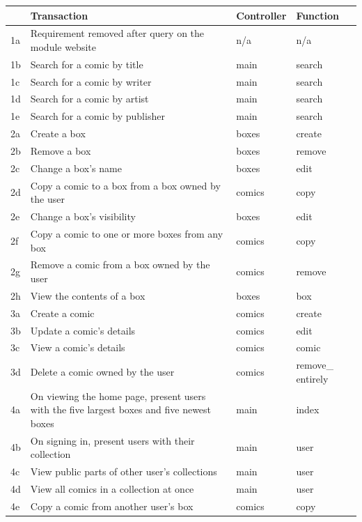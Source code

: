 \documentclass{scrreprt}
\begin{document}
\begin{table}[h]
	\begin{threeparttable}
		\begin{tabular}{ p{0.5cm} p{10cm} p{1.4cm} p{1.4cm} }
			\hline
			& Transaction & Controller & Function \\
			\hline
			1a & Requirement removed after query on the module website & n/a & n/a \\
			1b & Search for a comic by title & main & search \\
			1c & Search for a comic by writer & main & search \\
			1d & Search for a comic by artist & main & search \\
			1e & Search for a comic by publisher & main & search \\
			\hline
			2a & Create a box & boxes & create \\
			2b & Remove a box & boxes & remove \\
			2c & Change a box's name & boxes & edit \\
			2d & Copy a comic to a box from a box owned by the user & comics & copy\tnote{1} \\
			2e & Change a box's visibility & boxes & edit \\
			2f & Copy a comic to one or more boxes from any box & comics & copy\tnote{2} \\
			2g & Remove a comic from a box owned by the user & comics & remove \\
			2h & View the contents of a box & boxes & box \\
			\hline
			3a & Create a comic & comics & create \\
			3b & Update a comic's details & comics & edit \\
			3c & View a comic's details & comics & comic \\
			3d & Delete a comic owned by the user & comics & remove\_ entirely \\
			\hline
			4a & On viewing the home page, present users with the five largest boxes and five newest boxes & main & index \\
			4b & On signing in, present users with their collection & main & user\tnote{3} \\
			4c & View public parts of other user's collections & main & user \\
			4d & View all comics in a collection at once & main & user\tnote{4} \\
			4e & Copy a comic from another user's box & comics & copy\tnote{2} \\
			\hline
		\end{tabular}
		

\end{threeparttable}
\end{table}
\end{document}
